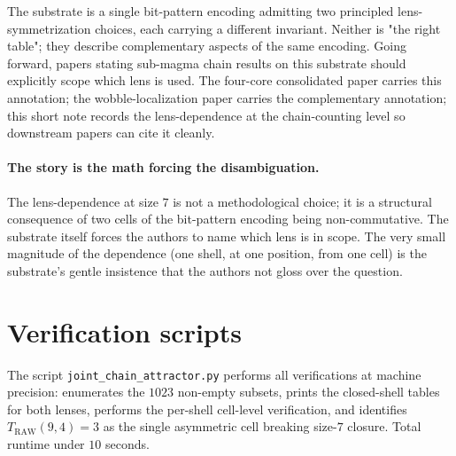 \documentclass[11pt,reqno]{amsart}
\theoremstyle{definition}
\newcommand{\TRAW}{T_{\mathrm{RAW}}}
\begin{document}
The substrate is a single bit-pattern encoding admitting two
principled lens-symmetrization choices, each carrying a different
invariant. Neither is "the right table"; they describe complementary
aspects of the same encoding. Going forward, papers stating
sub-magma chain results on this substrate should explicitly scope
which lens is used. The four-core consolidated paper carries this
annotation; the wobble-localization paper carries the
complementary annotation; this short note records the
lens-dependence at the chain-counting level so downstream papers
can cite it cleanly.

\paragraph{The story is the math forcing the disambiguation.}

The lens-dependence at size $7$ is not a methodological choice; it
is a structural consequence of two cells of the bit-pattern
encoding being non-commutative. The substrate itself forces the
authors to name which lens is in scope. The very small magnitude
of the dependence (one shell, at one position, from one cell) is
the substrate's gentle insistence that the authors not gloss over
the question.

\section*{Verification scripts}

The script \texttt{joint\_chain\_attractor.py} \cite{Gen13WP115}
performs all verifications at machine precision: enumerates the
$1023$ non-empty subsets, prints the closed-shell tables for both
lenses, performs the per-shell cell-level verification, and
identifies $\TRAW(9, 4) = 3$ as the single asymmetric cell
breaking size-$7$ closure. Total runtime under $10$ seconds.
\end{document}
